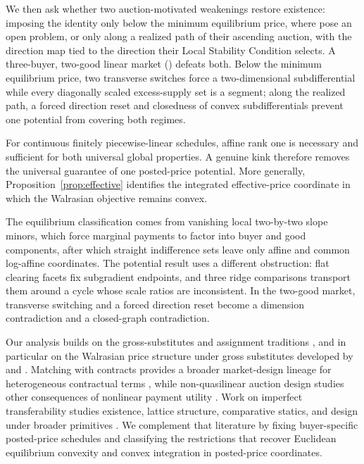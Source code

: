 \documentclass[11pt,a4paper,fleqn]{article}
\theoremstyle{plain}
\theoremstyle{definition}
\begin{document}
We then ask whether two auction-motivated weakenings restore existence: imposing the identity only below the minimum equilibrium price, where \citet{okisato2026} pose an open problem, or only along a realized path of their ascending auction, with the direction map tied to the direction their Local Stability Condition selects. A three-buyer, two-good linear market () defeats both. Below the minimum equilibrium price, two transverse switches force a two-dimensional subdifferential while every diagonally scaled excess-supply set is a segment; along the realized path, a forced direction reset and closedness of convex subdifferentials prevent one potential from covering both regimes.

For continuous finitely piecewise-linear schedules, affine rank one is necessary and sufficient for both universal global properties. A genuine kink therefore removes the universal guarantee of one posted-price potential. More generally, Proposition~\ref{prop:effective} identifies the integrated effective-price coordinate in which the Walrasian objective remains convex.

The equilibrium classification comes from vanishing local two-by-two slope minors, which force marginal payments to factor into buyer and good components, after which straight indifference sets leave only affine and common log-affine coordinates. The potential result uses a different obstruction: flat clearing facets fix subgradient endpoints, and three ridge comparisons transport them around a cycle whose scale ratios are inconsistent. In the two-good market, transverse switching and a forced direction reset become a dimension contradiction and a closed-graph contradiction.

Our analysis builds on the gross-substitutes and assignment traditions \citep{shapleyshubik1971,kelsocrawford1982,bikhchandanimamer1997,danilovkoshevoymurota2001,murota2003,baldwinklemperer2019}, and in particular on the Walrasian price structure under gross substitutes developed by \citet{gulstacchetti1999} and \citet{milgromstrulovici2009}. Matching with contracts provides a broader market-design lineage for heterogeneous contractual terms \citep{hatfieldmilgrom2005}, while non-quasilinear auction design studies other consequences of nonlinear payment utility \citep{baisa2017}. Work on imperfect transferability studies existence, lattice structure, comparative statics, and design under broader primitives \citep{demangegale1985,alkan1989,alkan1992,galichonkominersweber2019,baldwinjagadeesanklempererteytelboym2023,fleineretal2019,schlegel2022,galichonweber2024}. We complement that literature by fixing buyer-specific posted-price schedules and classifying the restrictions that recover Euclidean equilibrium convexity and convex integration in posted-price coordinates.
\end{document}
